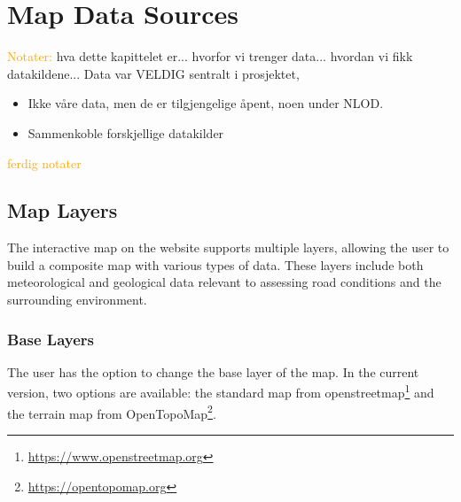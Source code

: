 \chapter{Map Data Sources}\label{chap:mapdatasources}

\textcolor{orange}{Notater:}
hva dette kapittelet er... hvorfor vi trenger data... hvordan vi fikk datakildene... 
Data var VELDIG sentralt i prosjektet, 
\begin{itemize}
    \item Ikke våre data, men de er tilgjengelige åpent, noen under NLOD.
    \item Sammenkoble forskjellige datakilder
\end{itemize}
\textcolor{orange}{ferdig notater}

\section{Map Layers}\label{sec:maplayers}

The interactive map on the website supports multiple layers, allowing the user to build a composite map with various types of data. These layers include both meteorological and geological data relevant to assessing road conditions and the surrounding environment.

\subsection{Base Layers}\label{subsec:baselayers}

The user has the option to change the base layer of the map. In the current version, two options are available: the standard map from \Gls{openstreetmap}\footnote{\url{https://www.openstreetmap.org}} and the terrain map from OpenTopoMap\footnote{\url{https://opentopomap.org}}.

